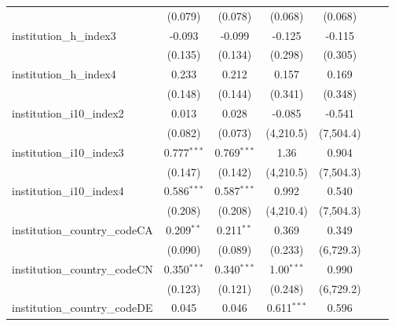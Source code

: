 \begin{tabular}{lcccccc}
                                         & (0.079)        & (0.078)        & (0.068)       & (0.068)       &     &   \\   
   institution\_h\_index3                & -0.093         & -0.099         & -0.125        & -0.115        &     &   \\   
                                         & (0.135)        & (0.134)        & (0.298)       & (0.305)       &     &   \\   
   institution\_h\_index4                & 0.233          & 0.212          & 0.157         & 0.169         &     &   \\   
                                         & (0.148)        & (0.144)        & (0.341)       & (0.348)       &     &   \\   
   institution\_i10\_index2              & 0.013          & 0.028          & -0.085        & -0.541        &     &   \\   
                                         & (0.082)        & (0.073)        & (4,210.5)     & (7,504.4)     &     &   \\   
   institution\_i10\_index3              & 0.777$^{***}$  & 0.769$^{***}$  & 1.36          & 0.904         &     &   \\   
                                         & (0.147)        & (0.142)        & (4,210.5)     & (7,504.3)     &     &   \\   
   institution\_i10\_index4              & 0.586$^{***}$  & 0.587$^{***}$  & 0.992         & 0.540         &     &   \\   
                                         & (0.208)        & (0.208)        & (4,210.4)     & (7,504.3)     &     &   \\   
   institution\_country\_codeCA          & 0.209$^{**}$   & 0.211$^{**}$   & 0.369         & 0.349         &     &   \\   
                                         & (0.090)        & (0.089)        & (0.233)       & (6,729.3)     &     &   \\   
   institution\_country\_codeCN          & 0.350$^{***}$  & 0.340$^{***}$  & 1.00$^{***}$  & 0.990         &     &   \\   
                                         & (0.123)        & (0.121)        & (0.248)       & (6,729.2)     &     &   \\   
   institution\_country\_codeDE          & 0.045          & 0.046          & 0.611$^{***}$ & 0.596         &     &   \\   

\end{tabular}
